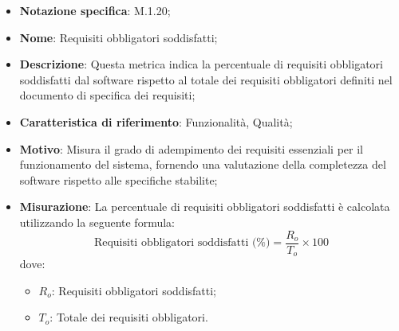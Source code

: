 \begin{itemize}
    \item \textbf{Notazione specifica}: M.1.20;
    \item \textbf{Nome}: Requisiti obbligatori soddisfatti;
    \item \textbf{Descrizione}: Questa metrica indica la percentuale di requisiti obbligatori soddisfatti dal software rispetto al totale dei requisiti obbligatori definiti nel documento di specifica dei requisiti;
    \item \textbf{Caratteristica di riferimento}: Funzionalità, Qualità;
    \item \textbf{Motivo}: Misura il grado di adempimento dei requisiti essenziali per il funzionamento del sistema, fornendo una valutazione della completezza del software rispetto alle specifiche stabilite;
    \item \textbf{Misurazione}: La percentuale di requisiti obbligatori soddisfatti è calcolata utilizzando la seguente formula:
    \[
    \text{Requisiti obbligatori soddisfatti (\%)} = \frac{R_{o}}{T_{o}} \times 100
    \]
    dove:
    \begin{itemize}
        \item $R_{o}$: Requisiti obbligatori soddisfatti;
        \item $T_{o}$: Totale dei requisiti obbligatori.
    \end{itemize}
\end{itemize}
